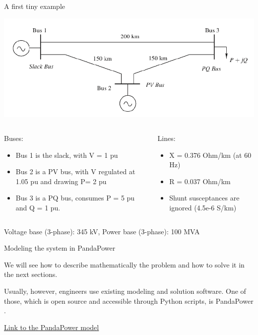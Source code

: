 \begin{frame}[allowframebreaks]{A first tiny example}
    \begin{center}
        \includegraphics[width=0.8\linewidth]{images/PF_net_1.png}
    \end{center}
    \begin{columns}
        \begin{column}{0.5\linewidth}
            Buses:
            \begin{itemize}
                \item Bus 1 is the slack, with V = 1 pu
                \item Bus 2 is a PV bus, with V regulated at 1.05 pu and drawing P= 2 pu
                \item Bus 3 is a PQ bus, consumes P = 5 pu and Q = 1 pu.
            \end{itemize}
        \end{column}
        \begin{column}{0.5\linewidth}
            Lines:
            \begin{itemize}
                \item X = 0.376 Ohm/km (at 60 Hz)
                \item R = 0.037 Ohm/km
                \item Shunt susceptances are ignored (4.5e-6 S/km)
            \end{itemize}
        \end{column}
    \end{columns}
    Voltage base (3-phase): 345 kV,
    Power base (3-phase): 100 MVA
\end{frame}


\begin{frame}{Modeling the system in PandaPower}

    We will see how to describe mathematically the problem and how to solve it in the next sections.

    Usually, however, engineers use existing modeling and solution software.
    One of those, which is open source and accessible through Python scripts, is PandaPower \cite{thurner2018pandapower}. 

    \href{https://colab.research.google.com/drive/103VIzly2huoS-PjnYdbCaeBS1dunJS7H?usp=sharing}{\underline{Link to the PandaPower model}} 
    
\end{frame}

